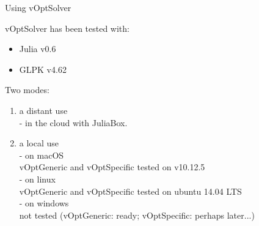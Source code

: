 \documentclass[10pt,xcolor=dvipsnames]{beamer}
\begin{document}
%
% 
\begin{frame}{Using vOptSolver}

vOptSolver has been tested with:
\begin{itemize}
\item Julia v0.6
\item GLPK v4.62
\end{itemize}
\bigskip

Two modes:\\ 
\begin{enumerate}
\item a distant use \\
     \quad - in the cloud with JuliaBox.

\medskip
\item a local use   \\
    \quad - on macOS\\ \qquad vOptGeneric and vOptSpecific  tested on v10.12.5 \\
    \quad  - on linux\\ \qquad vOptGeneric and vOptSpecific tested on ubuntu 14.04 LTS\\
    \quad  - on windows\\ \qquad not tested (vOptGeneric: ready; vOptSpecific: perhaps later...)
\end{enumerate}

\end{frame}
\end{document}
